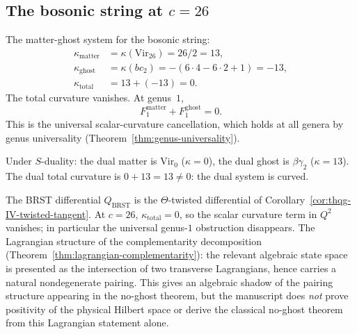 %
%

\subsection{The bosonic string at \texorpdfstring{$c = 26$}{c = 26}}
\label{subsec:thqg-IV-bosonic-string}

\begin{computation}
\label{comp:thqg-IV-bosonic-budget}
The matter-ghost system for the bosonic string:
\begin{align}
\kappa_{\mathrm{matter}} &= \kappa(\mathrm{Vir}_{26})
= 26/2 = 13, \label{eq:thqg-IV-bosonic-matter}\\
\kappa_{\mathrm{ghost}} &= \kappa(bc_2)
= -(6 \cdot 4 - 6 \cdot 2 + 1) = -13, \label{eq:thqg-IV-bosonic-ghost}\\
\kappa_{\mathrm{total}} &= 13 + (-13) = 0.
 \label{eq:thqg-IV-bosonic-total}
\end{align}
The total curvature vanishes. At genus~$1$,
\[
 F_1^{\mathrm{matter}} + F_1^{\mathrm{ghost}} = 0.
\]
This is the universal scalar-curvature cancellation, which holds
at all genera by genus universality
(Theorem~\ref{thm:genus-universality}).

Under $S$-duality: the dual matter is $\mathrm{Vir}_0$ ($\kappa = 0$),
the dual ghost is $\beta\gamma_2$ ($\kappa = 13$). The dual total
curvature is $0 + 13 = 13 \neq 0$: the dual system is curved.
\end{computation}

\begin{remark}
\label{rem:thqg-IV-no-ghost}
The BRST differential $Q_{\mathrm{BRST}}$ is the $\Theta$-twisted
differential of Corollary~\ref{cor:thqg-IV-twisted-tangent}.
At $c = 26$, $\kappa_{\mathrm{total}} = 0$, so the scalar curvature
term in $Q^2$ vanishes; in particular the universal genus-$1$
obstruction disappears. The Lagrangian
structure of the complementarity decomposition
(Theorem~\ref{thm:lagrangian-complementarity}): the
relevant algebraic state space is presented as the intersection of two
transverse Lagrangians, hence carries a natural nondegenerate pairing.
This gives an algebraic shadow of the pairing structure appearing in the
no-ghost theorem, but the manuscript does \emph{not} prove positivity of
the physical Hilbert space or derive the classical no-ghost theorem from
this Lagrangian statement alone.
\end{remark}


